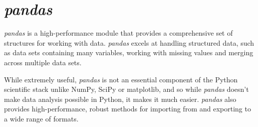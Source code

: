 \documentclass[KSmain.tex]{subfiles}
\begin{document}
 
	
	\section{\textit{pandas}}
	\textit{pandas} is a high-performance module that provides a comprehensive set of structures for working with
	data. \textit{pandas} excels at handling structured data, such as data sets containing many variables, working with
	missing values and merging across multiple data sets. 
	
	While extremely useful, \textit{pandas} is not an essential component of the Python scientific stack unlike NumPy, SciPy or matplotlib, and so while \textit{pandas} doesn’t
	make data analysis possible in Python, it makes it much easier. \textit{pandas} also provides high-performance,
	robust methods for importing from and exporting to a wide range of formats.

\end{document}
